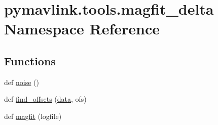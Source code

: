 \hypertarget{namespacepymavlink_1_1tools_1_1magfit__delta}{}\section{pymavlink.\+tools.\+magfit\+\_\+delta Namespace Reference}
\label{namespacepymavlink_1_1tools_1_1magfit__delta}
\subsection*{Functions}
\begin{DoxyCompactItemize}
\item 
def \mbox{\hyperlink{namespacepymavlink_1_1tools_1_1magfit__delta_a916fe58238a78962c0fe73909e6acafe}{noise}} ()
\item 
def \mbox{\hyperlink{namespacepymavlink_1_1tools_1_1magfit__delta_a9ac6d8af876f202d906aadabe7c39e46}{find\+\_\+offsets}} (\mbox{\hyperlink{structdata}{data}}, ofs)
\item 
def \mbox{\hyperlink{namespacepymavlink_1_1tools_1_1magfit__delta_a29df37e1c387e2a17988c9028c7c9b6e}{magfit}} (logfile)
\end{DoxyCompactItemize}
